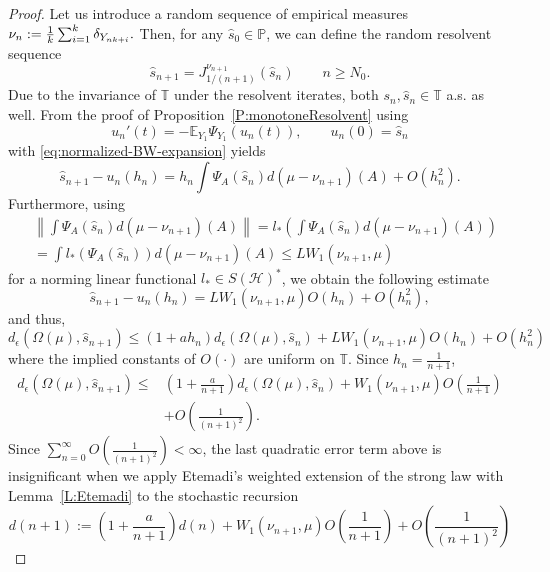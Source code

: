 \documentclass[12pt,reqno]{amsart}
\begin{document}
\begin{proof}
Let us introduce a random sequence of empirical measures $\nu_n:= {1 \over k} \sum_{i=1}^k \delta_{Y_{nk+i}}.$
Then, for any $\hat{s}_0 \in \mathbb{P}$, we can define the random resolvent sequence $$\hat{s}_{n+1}=J_{1/(n+1)}^{\nu_{n+1}}(\hat{s}_{n}) \qquad n \geq N_0.$$
Due to the invariance of $\mathbb{T}$ under the resolvent iterates, both ${s}_{n},\hat{s}_{n}\in\mathbb{T}$ a.s. as well.
From the proof of Proposition~\ref{P:monotoneResolvent} using
\[
u_n'(t)=-\mathbb{E}_{Y_1}\Psi_{Y_1}(u_n(t)),\qquad u_n(0)=\hat{s}_n
\]
with \eqref{eq:normalized-BW-expansion} yields
\begin{equation*}
\hat{s}_{n+1}-u_n(h_n)=h_n \int\Psi_{A}(\hat{s}_n)d(\mu-\nu_{n+1})(A)+O(h_n^2).
\end{equation*}
Furthermore, using
\begin{equation*}
\begin{split}
&\left\|\int\Psi_{A}(\hat{s}_n)d(\mu-\nu_{n+1})(A)\right\|=l_*\left(\int\Psi_{A}(\hat{s}_n)d(\mu-\nu_{n+1})(A)\right)\\
&=\int l_*\left(\Psi_{A}(\hat{s}_n)\right)d(\mu-\nu_{n+1})(A)\leq LW_1(\nu_{n+1},\mu)
\end{split}
\end{equation*}
for a norming linear functional $l_*\in S(\mathcal H)^*$, we obtain the following estimate
\begin{equation}\label{eq1:wass_P2}
\hat{s}_{n+1}-u_n(h_n)= LW_1(\nu_{n+1},\mu)O(h_n)+O(h_n^2),
\end{equation}
and thus,
\[
d_\epsilon(\Omega(\mu),\hat{s}_{n+1})
\le
(1+a h_n) d_\epsilon(\Omega(\mu),\hat{s}_{n}) + L W_1(\nu_{n+1},\mu)O(h_n)+O(h_n^2)
\]
where the implied constants of $O(\cdot)$ are uniform on $\mathbb{T}$.
Since \(h_n=\frac1{n+1}\),
\begin{equation}\label{eq2:wass_P2}
\begin{split}
d_\epsilon(\Omega(\mu),\hat{s}_{n+1})
\le
& \left( 1+\frac{a}{n+1} \right) d_\epsilon(\Omega(\mu),\hat{s}_{n}) + W_1(\nu_{n+1},\mu) O\!\left(\frac{1}{n+1}\right)\\
& + O\!\left(\frac1{(n+1)^2}\right).
\end{split}
\end{equation}
Since $\sum_{n=0}^\infty O\!\left(\frac1{(n+1)^2}\right)<\infty$, the last quadratic error term above is insignificant when we apply Etemadi's weighted extension of the strong law with Lemma~\ref{L:Etemadi} to the stochastic recursion
\begin{equation*}
d(n+1):=\left(1+\frac{a}{n+1}\right)d(n)+W_1(\nu_{n+1},\mu)O\!\left(\frac{1}{n+1}\right)+O\!\left(\frac1{(n+1)^2}\right)

\end{equation*}
\end{proof}
\end{document}
